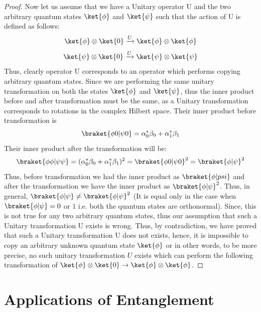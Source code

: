 \documentclass[12pt, oneside]{book}
\theoremstyle{definition}
\theoremstyle{definition}
\theoremstyle{remark}
\begin{document}
\begin{proof}
    Now let us assume that we have a Unitary operator U and the two arbitrary quantum states $\ket{\phi}$ and $\ket{\psi}$ such that the action of U is defined as follows:
    \[
    \ket{\phi}\otimes \ket{0} \xrightarrow{U} \ket{\phi}\otimes \ket{\phi}
    \]
    \[
    \ket{\psi}\otimes \ket{0} \xrightarrow{U}\ket{\psi}\otimes \ket{\psi}
    \]
    Thus, clearly operator U corresponds to an operator which performs copying arbitrary quantum states.
    Since we are performing the same unitary transformation on both the states $\ket{\phi}$ and $\ket{\psi}$, thus the inner product before and after transformation must be the same, as a Unitary transformation corresponds to rotations in the complex Hilbert space. Their inner product before transformation is 
    \[
    \braket{\phi0|\psi0}=\alpha^*_0\beta_0+\alpha^*_1\beta_1
    \]
    Their inner product after the transformation will be:
    \[
    \braket{\phi\phi|\psi\psi}=(\alpha^*_0\beta_0+\alpha^*_1\beta_1)^2=\braket{\phi0|\psi0}^2=\braket{\phi|\psi}^2
    \]
    Thus, before transformation we had the inner product as $\braket{\phi|psi}$ and after the transformation we have the inner product as $\braket{\phi|\psi}^2$. Thus, in general, $\braket{\phi|\psi}\neq \braket{\phi|\psi}^2$ (It is equal only in the case when $\braket{\phi|\psi}=0$ or $1$ i.e. both the quantum states are orthonormal). Since, this is not true for any two arbitrary quantum states, thus our assumption that such a Unitary transformation U exists is wrong. Thus, by contradiction, we have proved that such a Unitary transformation U does not exists, hence, it is impossible to copy an arbitrary unknown quantum state $\ket{\phi}$ or in other words, to be more precise, no such unitary transformation $U$ exists which can perform the following transformation of $\ket{\phi} \otimes \ket{0} \rightarrow \ket{\phi} \otimes \ket{\phi}$.
\end{proof}

\section{Applications of Entanglement}
\end{document}
